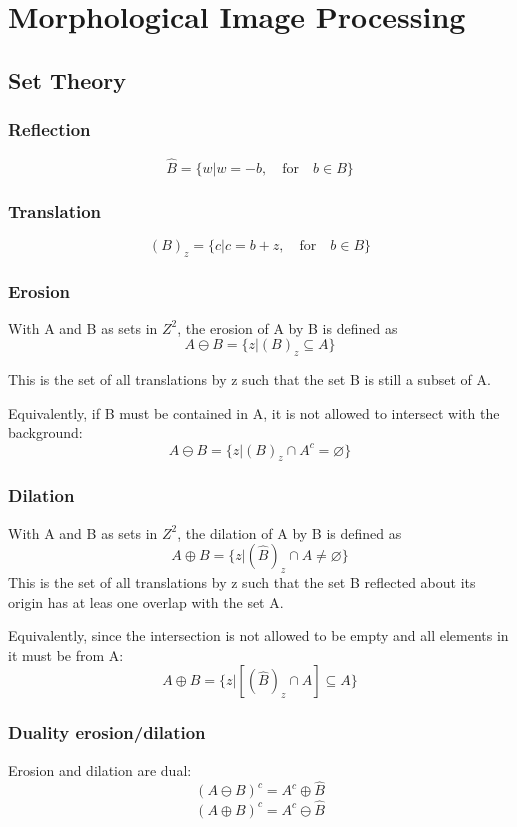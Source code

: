 \section{Morphological Image Processing}

\subsection{Set Theory}
\begin{multicols}{2}
\subsubsection{Reflection}
\[
	\hat{B} = \{w | w = -b,\quad \text{for} \quad b \in B \}
\]


\subsubsection{Translation}
\[
	(B)_z = \{ c | c = b + z,\quad \text{for} \quad b \in B\}
\]


\subsubsection{Erosion}
With A and B as sets in $Z^2$, the erosion of A by B is defined as
\[
	A \ominus B = \{z|(B)_z \subseteq A  \}
\]

This is the set of all translations by z such that the set B is still a subset of A.

Equivalently, if B must be contained in A, it is not allowed to intersect with the background:
\[
	A \ominus B = \{z|(B)_z \cap A^c = \varnothing  \}
\]


\subsubsection{Dilation}
With A and B as sets in $Z^2$, the dilation of A by B is defined as
\[
	A \oplus B = \{z |(\hat{B})_z \cap A \neq \varnothing \}
\]
This is the set of all translations by z such that the set B reflected about its origin has at leas one overlap with the set A.

Equivalently, since the intersection is not allowed to be empty and all elements in it must be from A:
\[
	A \oplus B = \{z | [(\hat{B})_z \cap A] \subseteq A \}
\]


\subsubsection{Duality erosion/dilation}
Erosion and dilation are dual:
\[
	(A  \ominus B)^c = A^c \oplus \hat{B}
\]
\[
	(A \oplus B)^c = A^c \ominus \hat{B}
\]

\end{multicols}

